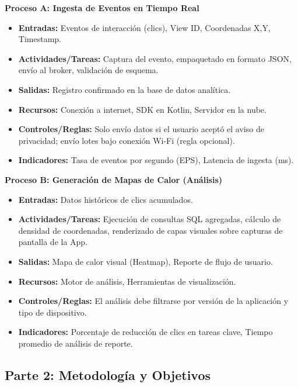 \documentclass[final,3p,times]{elsarticle}
\begin{document}
\textbf{Proceso A: Ingesta de Eventos en Tiempo Real}
\begin{itemize}
    \item \textbf{Entradas:} Eventos de interacción (clics), View ID, Coordenadas X,Y, Timestamp.
    \item \textbf{Actividades/Tareas:} Captura del evento, empaquetado en formato JSON, envío al broker, validación de esquema.
    \item \textbf{Salidas:} Registro confirmado en la base de datos analítica.
    \item \textbf{Recursos:} Conexión a internet, SDK en Kotlin, Servidor en la nube.
    \item \textbf{Controles/Reglas:} Solo envío datos si el usuario aceptó el aviso de privacidad; envío lotes bajo conexión Wi-Fi (regla opcional).
    \item \textbf{Indicadores:} Tasa de eventos por segundo (EPS), Latencia de ingesta (ms).
\end{itemize}

\textbf{Proceso B: Generación de Mapas de Calor (Análisis)}
\begin{itemize}
    \item \textbf{Entradas:} Datos históricos de clics acumulados.
    \item \textbf{Actividades/Tareas:} Ejecución de consultas SQL agregadas, cálculo de densidad de coordenadas, renderizado de capas visuales sobre capturas de pantalla de la App.
    \item \textbf{Salidas:} Mapa de calor visual (Heatmap), Reporte de flujo de usuario.
    \item \textbf{Recursos:} Motor de análisis, Herramientas de visualización.
    \item \textbf{Controles/Reglas:} El análisis debe filtrarse por versión de la aplicación y tipo de dispositivo.
    \item \textbf{Indicadores:} Porcentaje de reducción de clics en tareas clave, Tiempo promedio de análisis de reporte.
\end{itemize}

\subsection{Parte 2: Metodología y Objetivos}
\end{document}
